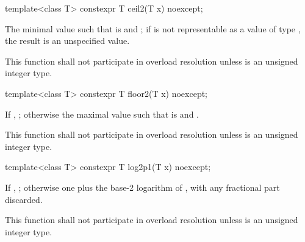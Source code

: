 %
\begin{itemdecl}
template<class T>
  constexpr T ceil2(T x) noexcept;
\end{itemdecl}

\begin{itemdescr}
\pnum
\returns
The minimal value  such that
 is  and ;
if  is not representable as a value of type ,
the result is an unspecified value.

\pnum
\remarks
This function shall not participate in overload resolution
unless  is an unsigned integer type.
\end{itemdescr}

%
\begin{itemdecl}
template<class T>
  constexpr T floor2(T x) noexcept;
\end{itemdecl}

\begin{itemdescr}
\pnum
\returns
If , ;
otherwise the maximal value 
such that  is  and .

\pnum
\remarks
This function shall not participate in overload resolution
unless  is an unsigned integer type.
\end{itemdescr}

%
\begin{itemdecl}
template<class T>
  constexpr T log2p1(T x) noexcept;
\end{itemdecl}

\begin{itemdescr}
\pnum
\returns
If , ;
otherwise one plus the base-2 logarithm of ,
with any fractional part discarded.

\pnum
\remarks
This function shall not participate in overload resolution
unless  is an unsigned integer type.
\end{itemdescr}


